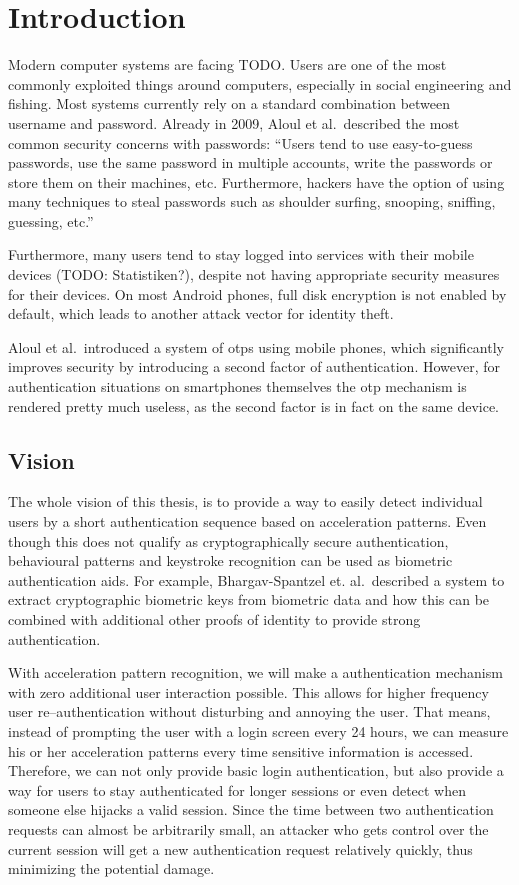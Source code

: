 \chapter{Introduction}\label{chapter:introduction}
Modern computer systems are facing TODO. Users are one of the most commonly exploited things around computers, especially in social engineering and fishing. Most systems currently rely on a standard combination between username and password. Already in 2009, Aloul et al.\ described the most common security concerns with passwords:\cite{aloul2009two}
``Users tend to use easy-to-guess passwords, use the same password in multiple accounts, write the passwords or store them on their machines, etc. Furthermore, hackers have the option of using many techniques to steal passwords such as shoulder surfing, snooping, sniffing, guessing, etc.''

Furthermore, many users tend to stay logged into services with their mobile devices (TODO: Statistiken?), despite not having appropriate security measures for their devices. On most Android phones, full disk encryption is not enabled by default, which leads to another attack vector for identity theft.

Aloul et al.\ introduced a system of \glspl{otp} using mobile phones, which significantly improves security by introducing a second factor of authentication. However, for authentication situations on smartphones themselves the \gls{otp} mechanism is rendered pretty much useless, as the second factor is in fact on the same device.
\cite{bishop2006pattern}
\section{Vision}
The whole vision of this thesis, is to provide a way to easily detect individual users by a short authentication sequence based on acceleration patterns. Even though this does not qualify as cryptographically secure authentication, behavioural patterns and keystroke recognition can be used as biometric authentication aids. For example, Bhargav-Spantzel et. al.\cite{bhargav2006privacy}\ described a system to extract cryptographic biometric keys from biometric data and how this can be combined with additional other proofs of identity to provide strong authentication.

With acceleration pattern recognition, we will make a authentication mechanism with zero additional user interaction possible. This allows for higher frequency user re--authentication without disturbing and annoying the user. That means, instead of prompting the user with a login screen every 24 hours, we can measure his or her acceleration patterns every time sensitive information is accessed. Therefore, we can not only provide basic login authentication, but also provide a way for users to stay authenticated for longer sessions or even detect when someone else hijacks a valid session. Since the time between two authentication requests can almost be arbitrarily small, an attacker who gets control over the current session will get a new authentication request relatively quickly, thus minimizing the potential damage.
